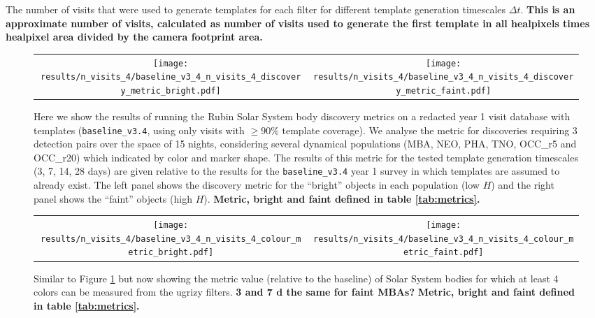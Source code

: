 \documentclass[preprint,linenumbers]{aastex631}
\newcommand{\baseline}{\texttt{baseline\_v3.4}\xspace}
\begin{document}
{		\begin{table}
			\centering
			
			\caption{
				The number of visits that were used to generate templates for each filter for different template generation timescales $\Delta t$.
				\textbf{This is an approximate number of visits, calculated as number of visits used to generate the first template in all healpixels times healpixel area divided by the camera footprint area.}
			}
			\label{tab:year1_N_visits_templates}
		\end{table}
		
		
		\begin{figure}
			\centering
			\begin{tabular}{c c}
				\texttt{[image: results/n\_visits\_4/baseline\_v3\_4\_n\_visits\_4\_discovery\_metric\_bright.pdf]} &
				\texttt{[image: results/n\_visits\_4/baseline\_v3\_4\_n\_visits\_4\_discovery\_metric\_faint.pdf]}
			\end{tabular}
			\caption{Here we show the results of running the Rubin Solar System body discovery metrics on a redacted year 1 visit database with templates (\baseline, using only visits with $\geq 90\%$ template coverage).
				We analyse the metric for discoveries requiring 3 detection pairs over the space of 15 nights, considering several dynamical populations (MBA, NEO, PHA, TNO, OCC\_r5 and OCC\_r20) which indicated by color and marker shape.
				The results of this metric for the tested template generation timescales (3, 7, 14, 28 days) are given relative to the results for the \baseline year 1 survey in which templates are assumed to already exist.
				The left panel shows the discovery metric for the ``bright'' objects in each population (low $H$) and the right panel shows the ``faint'' objects (high $H$).
				\textbf{Metric, bright and faint defined in table \ref{tab:metrics}.}
			}
			\label{fig:temp_gen_discovery_metrics}
		\end{figure}
		
		\begin{figure}
			\centering
			\begin{tabular}{c c}
				\texttt{[image: results/n\_visits\_4/baseline\_v3\_4\_n\_visits\_4\_colour\_metric\_bright.pdf]} &
				\texttt{[image: results/n\_visits\_4/baseline\_v3\_4\_n\_visits\_4\_colour\_metric\_faint.pdf]}
			\end{tabular}
			\caption{Similar to Figure \ref{fig:temp_gen_discovery_metrics} but now showing the metric value (relative to the baseline) of Solar System bodies for which at least 4 colors can be measured from the ugrizy filters.
				\textbf{3 and 7 d the same for faint MBAs?}
				\textbf{Metric, bright and faint defined in table \ref{tab:metrics}.}
			}
			\label{fig:temp_gen_colour_metrics}
		\end{figure}
		
}
\end{document}
